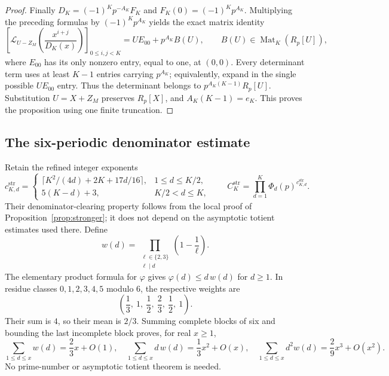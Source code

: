 \documentclass[11pt,letterpaper]{article}
\numberwithin{equation}{section}
\theoremstyle{remark}
\newcommand{\Lcal}{\mathcal L}
\begin{document}
\begin{proof}
Finally $D_K=(-1)^Kp^{-A_K}F_K$ and $F_K(0)=(-1)^Kp^{A_K}$. Multiplying the preceding formulas by $(-1)^Kp^{A_K}$ yields the exact matrix identity
\begin{equation}\label{eq:elementary-matrix}
 \left[\Lcal_{U-Z_M}\left(\frac{x^{i+j}}{D_K(x)}\right)\right]_{0\le i,j<K}
 =U E_{00}+p^{A_K}B(U),\qquad B(U)\in\operatorname{Mat}_K(R_p[U]),
\end{equation}
where $E_{00}$ has its only nonzero entry, equal to one, at $(0,0)$. Every determinant term uses at least $K-1$ entries carrying $p^{A_K}$; equivalently, expand in the single possible $U E_{00}$ entry. Thus the determinant belongs to $p^{A_K(K-1)}R_p[U]$. Substitution $U=X+Z_M$ preserves $R_p[X]$, and $A_K(K-1)=e_K$. This proves the proposition using one finite truncation.
\end{proof}

\subsection{The six-periodic denominator estimate}

Retain the refined integer exponents
\begin{equation*}
 c_{K,d}^{\mathrm{str}}=
 \begin{cases}
 \lceil K^2/(4d)+2K+17d/16\rceil,&1\le d\le K/2,\\
 5(K-d)+3,&K/2<d\le K,
 \end{cases}
 \qquad
 C_K^{\mathrm{str}}=\prod_{d=1}^K\Phi_d(p)^{c_{K,d}^{\mathrm{str}}}.
\end{equation*}
Their denominator-clearing property follows from the local proof of Proposition~\ref{prop:stronger}; it does not depend on the asymptotic totient estimates used there. Define
\begin{equation*}
 w(d)=\prod_{\substack{\ell\in\{2,3\}\\\ell\mid d}}\left(1-\frac1\ell\right).
\end{equation*}
The elementary product formula for $\varphi$ gives $\varphi(d)\le d\,w(d)$ for $d\ge1$. In residue classes $0,1,2,3,4,5$ modulo $6$, the respective weights are
\begin{equation*}
 \left(\frac13,\ 1,\ \frac12,\ \frac23,\ \frac12,\ 1\right).
\end{equation*}
Their sum is $4$, so their mean is $2/3$. Summing complete blocks of six and bounding the last incomplete block proves, for real $x\ge1$,
\begin{equation}\label{eq:sieve-moments}
 \sum_{1\le d\le x}w(d)=\frac23x+O(1),\quad
 \sum_{1\le d\le x}d\,w(d)=\frac13x^2+O(x),\quad
 \sum_{1\le d\le x}d^2w(d)=\frac29x^3+O(x^2).
\end{equation}
No prime-number or asymptotic totient theorem is needed.
\end{document}
